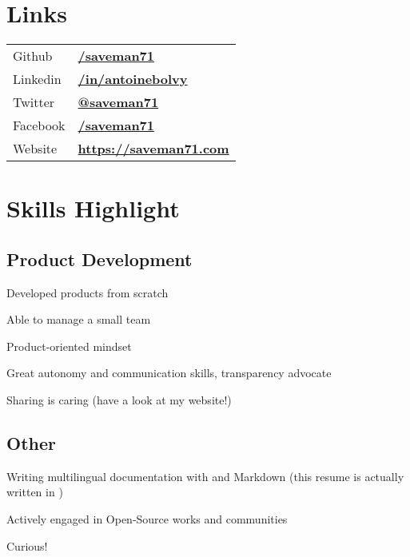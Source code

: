 \documentclass[
  english,
  a4paper
]{resume-openfont}
\begin{document}
\noindent%
\begin{minipage}[t]{0.31\textwidth}



\section{Links}
\begin{tabular}{@{}l@{\hskip 0.5em}l}
Github & \href{https://github.com/saveman71}{\bf /saveman71} \\
Linkedin & \href{https://www.linkedin.com/in/antoinebolvy}{\bf /in/antoinebolvy} \\
Twitter & \href{https://twitter.com/saveman71}{\bf @saveman71} \\
Facebook & \href{https://facebook.com/saveman71}{\bf /saveman71} \\
Website & \href{https://saveman71.com}{\bf https://saveman71.com} \\
\end{tabular}
\sectionsep


\section{Skills Highlight}
\subsection{Product Development}
\vspace{2pt}
\vspace{\topsep} %
\begin{tightemize}
  \item Developed products from scratch
  \item Able to manage a small team
  \item Product-oriented mindset
  \item Great autonomy and communication skills, transparency advocate
  \item Sharing is caring (have a look at my website!)
\end{tightemize}
\sectionsep

\vspace{-8pt}

\subsection{Other}
\vspace{2pt}
\vspace{\topsep} %
\begin{tightemize}
  \item Writing multilingual documentation with  and Markdown (this resume is actually written in )
  \item Actively engaged in Open-Source works and communities
  \item Curious!
\end{tightemize}


\end{minipage}
\end{document}
